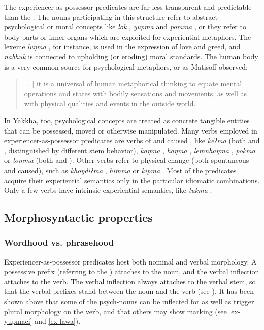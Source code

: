 The experiencer-as-possessor predicates are far less transparent and predictable than the . The nouns participating in this structure refer to abstract psychological or moral concepts like \emph{lok} , \emph{yupma}  and \emph{pomma} , or they refer to body parts or inner organs which are exploited for experiential metaphors. The lexeme \emph{luŋma} , for instance, is used in the expression of love and greed, and \emph{nabhuk}  is connected to upholding (or eroding) moral standards. The human body is a very common source for psychological metaphors, or as  Matisoff observed: 

\begin{quote}
[...] it is a universal of human metaphorical thinking to equate mental operations and states with bodily sensations and movements, as well as with physical qualities and events in the outside world. \citep[9]{Matisoff1986Hearts} 
\end{quote} 

In Yakkha, too, psychological concepts are treated as concrete tangible entities that can be possessed, moved or otherwise manipulated. Many verbs employed in experiencer-as-possessor predicates are verbs of  and caused , like \emph{keʔma} (both  and , distinguished by different stem behavior), \emph{kaŋma} , \emph{haŋma} , \emph{lemnhaŋma} , \emph{pokma}  or \emph{lomma} (both   and ). Other verbs refer to physical change (both spontaneous and caused), such as \emph{khoŋdiʔma} , \emph{himma}  or \emph{kipma} . Most of the predicates acquire their experiential semantics only in the particular idiomatic combinations. Only a few verbs have intrinsic experiential semantics, like \emph{tukma} .


\subsection{Morphosyntactic properties}\label{poss-e2}

\subsubsection{Wordhood vs. phrasehood}

Experiencer-as-possessor predicates host both nominal and verbal morphology. A possessive prefix (referring to the ) attaches to the noun, and the verbal inflection attaches to the verb. The verbal inflection always attaches to the verbal stem, so that the verbal prefixes stand between the noun and the verb (see \Next). It has been shown above that some of the  psych-nouns can  be inflected for  as well as trigger plural morphology on the verb, and that others may show  marking (see \ref{ex-yupmaci} and \ref{ex-lawa}).
\largerpage


